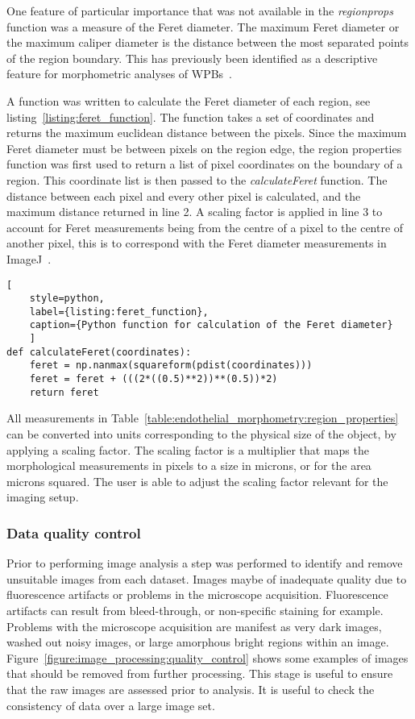 One feature of particular importance that was not available in the \emph{regionprops} function was a measure of the Feret diameter. The maximum Feret diameter or the maximum caliper diameter is the distance between the most separated points of the region boundary. This has previously been identified as a descriptive feature for morphometric analyses of WPBs~\cite{Ferraro2014}.

A function was written to calculate the Feret diameter of each region, see listing~\ref{listing:feret_function}. The function takes a set of coordinates and returns the maximum euclidean distance between the pixels. Since the maximum Feret diameter must be between pixels on the region edge, the region properties function was first used to return a list of pixel coordinates on the boundary of a region. This coordinate list is then passed to the \emph{calculateFeret} function. The distance between each pixel and every other pixel is calculated, and the maximum distance returned in line 2. A scaling factor is applied in line 3 to account for Feret measurements being from the centre of a pixel to the centre of another pixel, this is to correspond with the Feret diameter measurements in ImageJ~\cite{ImageJ2003}.
\begin{lstlisting}[
	style=python,
	label={listing:feret_function},
	caption={Python function for calculation of the Feret diameter}
	]
def calculateFeret(coordinates):
    feret = np.nanmax(squareform(pdist(coordinates)))
    feret = feret + (((2*((0.5)**2))**(0.5))*2)
    return feret
\end{lstlisting}
All measurements in Table~\ref{table:endothelial_morphometry:region_properties} can be converted into units corresponding to the physical size of the object, by applying a scaling factor. The scaling factor is a multiplier that maps the morphological measurements in pixels to a size in microns, or for the area microns squared. The user is able to adjust the scaling factor relevant for the imaging setup.

\subsubsection{Data quality control}
\label{endothelial_morphometry:image_processing:quality_control}
Prior to performing image analysis a step was performed to identify and remove unsuitable images from each dataset. Images maybe of inadequate quality due to fluorescence artifacts or problems in the microscope acquisition. Fluorescence artifacts can result from bleed-through, or non-specific staining for example. Problems with the microscope acquisition are manifest as very dark images, washed out noisy images, or large amorphous bright regions within an image. Figure~\ref{figure:image_processing:quality_control} shows some examples of images that should be removed from further processing. This stage is  useful to ensure that the raw images are assessed prior to analysis. It is useful to check the consistency of data over a large image set.

